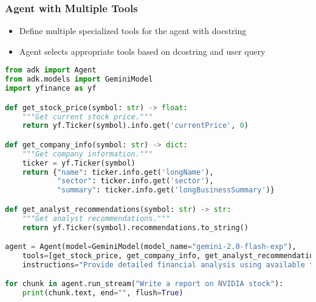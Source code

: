 \begin{frame}[fragile]\frametitle{Agent with Multiple Tools}
      \begin{itemize}
	\item Define multiple specialized tools for the agent with docstring
	\item Agent selects appropriate tools based on dcostring and user query
	  \end{itemize}
      
      \begin{lstlisting}[language=python, basicstyle=\tiny]
from adk import Agent
from adk.models import GeminiModel
import yfinance as yf

def get_stock_price(symbol: str) -> float:
    """Get current stock price."""
    return yf.Ticker(symbol).info.get('currentPrice', 0)

def get_company_info(symbol: str) -> dict:
    """Get company information."""
    ticker = yf.Ticker(symbol)
    return {"name": ticker.info.get('longName'),
            "sector": ticker.info.get('sector'),
            "summary": ticker.info.get('longBusinessSummary')}

def get_analyst_recommendations(symbol: str) -> str:
    """Get analyst recommendations."""
    return yf.Ticker(symbol).recommendations.to_string()

agent = Agent(model=GeminiModel(model_name="gemini-2.0-flash-exp"),
    tools=[get_stock_price, get_company_info, get_analyst_recommendations],
    instructions="Provide detailed financial analysis using available tools.")

for chunk in agent.run_stream("Write a report on NVIDIA stock"):
    print(chunk.text, end="", flush=True)
      \end{lstlisting}
\end{frame}

